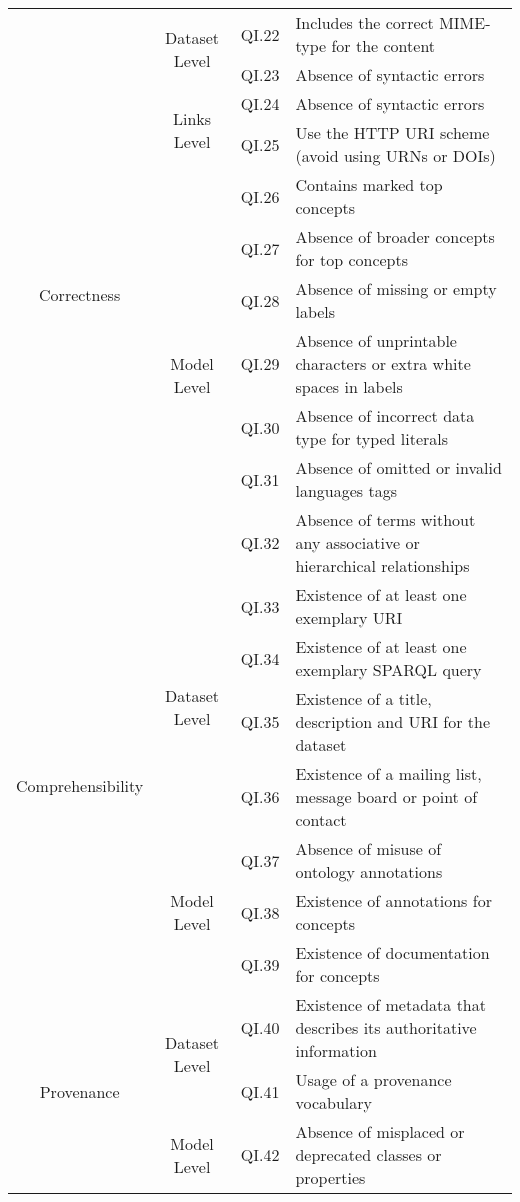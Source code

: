 \documentclass[onecolumn, crcready]{iosart2c}
\begin{document}
\begin{center}
{\begin{longtable}[h]{|c|c|c|l|}
\hline
\hline
\multirow{11}{*}{Correctness}  & \multirow{2}{*}{Dataset Level} & QI.22 & Includes the correct MIME-type for the content  \cite{Hogan2010}\tabularnewline
\cline{3-4}
 &  & QI.23 & Absence of syntactic errors \cite{Hogan2010}\tabularnewline
\cline{2-4}
 & \multirow{2}{*}{Links Level} & QI.24 & Absence of syntactic errors  \cite{Suominen2013}\tabularnewline
 \cline{3-4}
 &  & QI.25 & Use the HTTP URI scheme (avoid using URNs or DOIs) \cite{Mader2012}\tabularnewline
\cline{2-4}
 & \multirow{7}{*}{Model Level} & QI.26 & Contains marked top concepts \cite{Mader2012}\tabularnewline
\cline{3-4}
 &  & QI.27 & Absence of broader concepts for top concepts \cite{Mader2012}\tabularnewline
 \cline{3-4}
 & & QI.28 & Absence of missing or empty labels \cite{Acosta2013}\cite{Mader2012}\tabularnewline
  \cline{3-4}
 & & QI.29 & Absence of unprintable characters \cite{Acosta2013}\cite{Mader2012} or extra white spaces in labels \cite{Suominen:2012:IQS:2413941.2413985}\tabularnewline
\cline{3-4}
 &  & QI.30 & Absence of incorrect data type for typed literals \cite{Hogan2010}\cite{Acosta2013} \tabularnewline
\cline{3-4}
 &  & QI.31 & Absence of omitted or invalid languages tags \cite{Suominen:2012:IQS:2413941.2413985}\cite{Mader2012}\tabularnewline
\cline{3-4}
 &  & QI.32 & Absence of terms without any associative or hierarchical relationships \cite{journals/ires/Living10}\tabularnewline
\hline
\hline
\multirow{7}{*}{Comprehensibility} & \multirow{4}{*}{Dataset Level} & QI.33 & Existence of at least one exemplary URI \cite{Framework2012}\tabularnewline
\cline{3-4}
 &  & QI.34 & Existence of at least one exemplary SPARQL query \cite{Framework2012}\tabularnewline
 \cline{3-4}
 &  & QI.35 &  Existence of a title, description and URI for the dataset \tabularnewline
\cline{3-4}
 &  & QI.36 & Existence of a mailing list, message board or point of contact \cite{flemming2010}\tabularnewline
 \cline{2-4}
 & \multirow{3}{*}{Model Level} & QI.37 & Absence of misuse of ontology annotations \cite{Mader2012}\cite{DBLP:conf/ic3k/KeetSP13}\tabularnewline
  \cline{3-4}
 & & QI.38 & Existence of annotations for concepts \cite{DBLP:conf/ic3k/KeetSP13}\tabularnewline
 \cline{3-4}
 & & QI.39 & Existence of documentation for concepts \cite{Mader2012}\cite{DBLP:conf/ic3k/KeetSP13}\tabularnewline
\hline
\hline
\multirow{3}{*}{Provenance} & \multirow{2}{*}{Dataset Level} & QI.40 & Existence of metadata that describes its authoritative information  \cite{Flouris2012}\tabularnewline
\cline{3-4}
 &  & QI.41 & Usage of a provenance vocabulary\tabularnewline
\hline
\hline
\multirow{10}{*}{Coherence} & \multirow{10}{*}{Model Level} & QI.42 & Absence of misplaced or deprecated classes or properties  \cite{Hogan2010}\tabularnewline

\end{longtable}}
\end{center}
\end{document}
